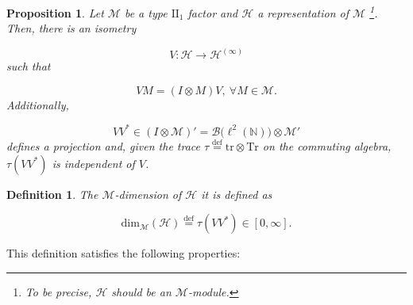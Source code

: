 \documentclass[a4paper,11pt]{article}
\newcommand{\eqdef}{\overset{\mathrm{def}}{=}}
\newtheorem{Definition}{Definition}[subsection]
\newtheorem{Proposition}{Proposition}[subsection]
\begin{document}
\begin{Proposition}
    Let $\mathcal{M}$ be a type $\mathrm{II}_1$ factor and $\mathcal{H}$ a representation of $\mathcal{M}$ \footnote{To be precise, $\mathcal{H}$ should be an $\mathcal{M}$-module.}. Then, there is an isometry

    \begin{equation}
        V : \mathcal{H} \rightarrow \mathcal{H}^{(\infty)}
    \end{equation}
    such that

    \begin{equation}
        V M = (I \otimes M) V, \ \forall M \in \mathcal{M} \text{.}
    \end{equation}
    Additionally,

    \begin{equation}
        V V^* \in (I \otimes \mathcal{M})' = \mathcal{B} \big( \ell^2(\mathbb{N}) \big) \otimes \mathcal{M}'
    \end{equation}
    defines a projection and, given the trace $\tau \eqdef \mathrm{tr} \otimes \mathrm{Tr}$ on the commuting algebra, $\tau (VV^*)$ is independent of $V$.
\end{Proposition}

\begin{Definition}
    The $\mathcal{M}$-\textnormal{dimension} of $\mathcal{H}$ it is defined as

    \begin{equation}
        \mathrm{dim}_{\mathcal{M}} (\mathcal{H}) \eqdef \tau(VV^*) \in [0, \infty] \text{.}
    \end{equation}
\end{Definition}

This definition satisfies the following properties:
\end{document}
